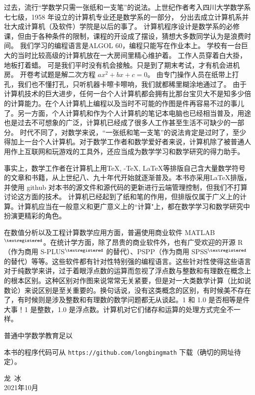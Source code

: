 \documentclass[main.tex]{subfiles}
\begin{document}
过去，流行“学数学只需一张纸和一支笔”的说法。上世纪作者考入四川大学数学系七七级，1958 年设立的计算机专业还是数学系的一部分，
分出去成立计算机系并壮大成计算机（及软件）学院是以后的事了。
计算机程序设计是数学系的必修课，但由于各种条件的限制，课程的开设成了摆设，猜想大多数同学认为是浪费时间。
我们学习的编程语言是ALGOL 60，编程只能写在作业本上。
学校有一台巨大的当时比较高级的计算机放在一大房间里精心维护着。
工作人员穿着白大掛，地板打着蜡。
可是我们平时没有机会接触。只是到了期末考试，才有机会进机房。
开卷考试题是解二次方程 $ax^2+bx+c = 0$。
由专门操作人员在纸带上打孔，我们也不懂打孔，只听机器卡嚓卡嚓响，我们就都稀里糊涂地通过了。
由于计算机技术的巨大进步，任何一台个人计算机都会拥有比那台宝贝大不是知多少倍的计算能力。在个人计算机上编程以及当时不可能的作图是件再容易不过的事儿了。另一方面，个人计算机和作为个人计算机的笔记本电脑也已经相当普及，用途也是过去不可想象的广泛，计算机已经成了很多人工作甚至生活不可缺少的一部分。
时代不同了，对数学来说，“一张纸和笔一支笔”的说法肯定是过时了，至少得加上一台个人计算机。对于数学工作者和数学爱好者来说，计算机除了被普通人用作上互联网和玩游戏的工具外，还应当成为数学学习和数学研究的得力助手。

事实上，数学工作者在计算机上用\TeX, \AmS-\TeX, \LaTeX 等排版自己含大量数学符号的文章和书籍，从上世纪八、九十年代开始就逐渐普及。本书亦采用\LaTeX 排版， 并使用 github 对本书的源文件和源代码的更新进行云端管理控制，但我们不打算讨论这方面的技术。
计算机已经起到了纸和笔的作用，但排版仅属于广义上的计算。计算机应当在一般意义和更广意义上的“计算"上，都在数学学习和数学研究中扮演更精彩的角色。

在数值分析以及工程计算数学应用方面，普遍使用商业软件 MATLAB${}^{\textregistered}$。在统计学方面，除了昂贵的商业软件外，也有广受欢迎的开源 R（作为商用 S-PLUS${}^{\textregistered}$ 的替代）、PSPP（作为商用 SPSS${}^{\textregistered}$ 的替代）等等。这些软件都有针对性特别强的编程语言。这些针对性使得这些语言对于纯数学来讲，过于着眼浮点数的运算而忽视了浮点数与整数和有理数在概念上的根本区别。这种区别对作图来说常常无关紧要，但是对一大类数学计算（比如说数论）来说区别是至关重要的。换句话说，没有这类概念的区别，有时候美不存在了，有时候则是涉及整数和有理数的数学问题都无从谈起。1 和 1.0 是否相等是件大事！1 是整数，1.0 是浮点数。计算机对它们储存和运算的处理方式完全不一样。

普通中学数学教育足以


本书的程序代码可从 \verb|https://github.com/longbingmath| 下载（确切的网址待定）。


\begin{flushright}
	\centering
{\kaishu 龙\,  冰}\\
2021年10月
\end{flushright}
\end{document}
